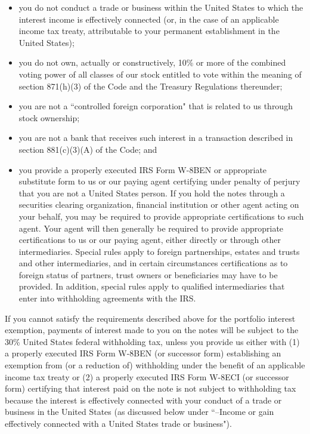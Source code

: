 \begin{select}
\begin{itemize}
	\item you do not conduct a trade or business within the United States to which the interest income is effectively connected (or, in the case of an applicable income tax treaty, attributable to your permanent establishment in the United States); 
	\item you do not own, actually or constructively, 10\% or more of the combined voting power of all classes of our stock entitled to vote within the meaning of section 871(h)(3) of the Code and the Treasury Regulations thereunder; 
	\item you are not a ``controlled foreign corporation" that is related to us through stock ownership; 
	\item you are not a bank that receives such interest in a transaction described in section 881(c)(3)(A) of the Code; and
	\item you provide a properly executed IRS Form W-8BEN or appropriate substitute form to us or our paying agent certifying under penalty of perjury that you are not a United States person. If you hold the notes through a securities clearing organization, financial institution or other agent acting on your behalf, you may be required to provide appropriate certifications to such agent. Your agent will then generally be required to provide appropriate certifications to us or our paying agent, either directly or through other intermediaries. Special rules apply to foreign partnerships, estates and trusts and other intermediaries, and in certain circumstances certifications as to foreign status of partners, trust owners or beneficiaries may have to be provided. In addition, special rules apply to qualified intermediaries that enter into withholding agreements with the IRS.	
	\end{itemize}

If you cannot satisfy the requirements described above for the portfolio interest exemption, payments of interest made to you on the notes will be subject to the 30\% United States federal withholding tax, unless you provide us either with (1) a properly executed IRS Form W-8BEN (or successor form) establishing an exemption from (or a reduction of) withholding under the benefit of an applicable income tax treaty or (2) a properly executed IRS Form W-8ECI (or successor form) certifying that interest paid on the note is not subject to withholding tax because the interest is effectively connected with your conduct of a trade or business in the United States (as discussed below under ``--Income or gain effectively connected with a United States trade or business").


\end{select}
